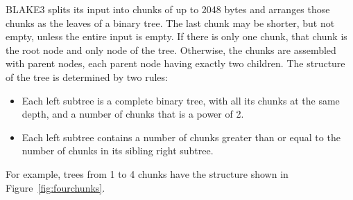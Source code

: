 \documentclass[11pt,notitlepage,a4paper]{article}
\begin{document}
BLAKE3 splits its input into chunks of up to 2048 bytes and arranges those
chunks as the leaves of a binary tree. The last chunk may be shorter, but not
empty, unless the entire input is empty. If there is only one chunk, that chunk
is the root node and only node of the tree. Otherwise, the chunks are assembled
with parent nodes, each parent node having exactly two children. The
structure of the tree is determined by two rules:
\begin{itemize}
    \item Each left subtree is a complete binary tree, with all its chunks at
        the same depth, and a number of chunks that is a power of 2.
    \item Each left subtree contains a number of chunks greater than or equal
        to the number of chunks in its sibling right subtree.
\end{itemize}
For example, trees from 1 to 4 chunks have the structure shown in
Figure~\ref{fig:fourchunks}.
\end{document}
